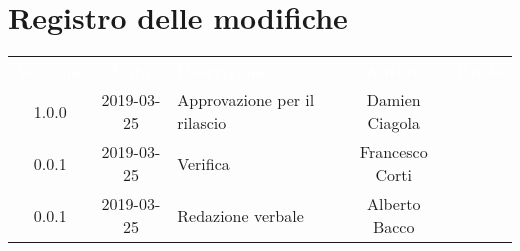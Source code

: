 \section*{Registro delle modifiche}
{
	\renewcommand{\arraystretch}{1.5}
	\centering
	\begin{longtable}{ c c  C{4cm}  c  c }
		
		\textcolor{white}{\textbf{Versione}} & \textcolor{white}{\textbf{Data}} & \textcolor{white}{\textbf{Descrizione}} & \textcolor{white}{\textbf{Autore}} & \textcolor{white}{\textbf{Ruolo}}\\
		1.0.0 & 2019-03-25 & Approvazione per il rilascio & Damien Ciagola & \Res{}\\
		0.0.1 & 2019-03-25 & Verifica & Francesco Corti & \ver{}\\
		0.0.1 & 2019-03-25 & Redazione verbale & Alberto Bacco & \reda{}\\
		
		
	\end{longtable}
	
}
